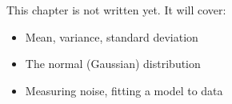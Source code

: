 \label{ch:stats}
\begin{keyidea}
This chapter is not written yet. It will cover:
\begin{itemize}[nosep]
  \item Mean, variance, standard deviation
  \item The normal (Gaussian) distribution
  \item Measuring noise, fitting a model to data
\end{itemize}
\end{keyidea}
